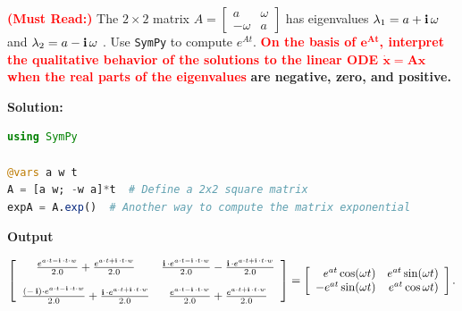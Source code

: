\bigskip
\begin{example} \textcolor{red}{\bf (Must Read:)} The $2 \times 2$ matrix  $A = \left[
\begin{array}{rr}
a & \omega \\
-\omega & a
\end{array}
\right]$ has eigenvalues $\lambda_1= a + \mathop{\bm{\mathrm i}} \omega$ and $\lambda_2= a - \mathop{\bm{\mathrm i}} \omega$ . Use \texttt{SymPy} to compute $e^{At}$. \textcolor{red}{\bf On the basis of $\bm{e^{At}}$, interpret the qualitative behavior of the solutions to the linear ODE $\bm{\dot{x} = Ax}$ when the real parts of the eigenvalues} \textbf{are negative, zero, and positive.}
\end{example}
\textbf{Solution:}

\begin{lstlisting}[language=Julia,style=mystyle]
using SymPy

@vars a w t
A = [a w; -w a]*t  # Define a 2x2 square matrix
expA = A.exp()  # Another way to compute the matrix exponential
\end{lstlisting}
\textbf{Output} 

$$
\left[
\begin{array}{cc}
\frac{e^{a \cdot t - \mathop{\bm{\mathrm i}} \cdot t \cdot w}}{2.0} + \frac{e^{a \cdot t + \mathop{\bm{\mathrm i}} \cdot t \cdot w}}{2.0} & \frac{ \mathop{\bm{\mathrm i}} \cdot e^{a \cdot t - \mathop{\bm{\mathrm i}} \cdot t \cdot w}}{2.0} - \frac{ \mathop{\bm{\mathrm i}} \cdot e^{a \cdot t + \mathop{\bm{\mathrm i}} \cdot t \cdot w}}{2.0} \\[1em]
\frac{\left(  - \mathop{\bm{\mathrm i}} \right) \cdot e^{a \cdot t - \mathop{\bm{\mathrm i}} \cdot t \cdot w}}{2.0} + \frac{ \mathop{\bm{\mathrm i}} \cdot e^{a \cdot t + \mathop{\bm{\mathrm i}} \cdot t \cdot w}}{2.0} & \frac{e^{a \cdot t - \mathop{\bm{\mathrm i}} \cdot t \cdot w}}{2.0} + \frac{e^{a \cdot t + \mathop{\bm{\mathrm i}} \cdot t \cdot w}}{2.0} \\
\end{array}
\right] = \left[
\begin{array}{rr}
e^{at} \cos(\omega t) & e^{at} \sin(\omega t) \\
-e^{at} \sin(\omega t) & e^{at} \cos\omega t) 
\end{array}
\right].
$$

\bigskip

